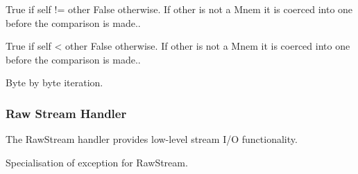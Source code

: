 \documentclass[letterpaper,10pt,english]{sphinxmanual}
\begin{document}
\begin{fulllineitems}
\begin{fulllineitems}
\label{\detokenize{ref/LIS/core/Mnem:TotalDepth.LIS.core.Mnem.Mnem.__ne__}}
True if self != other False otherwise.
If other is not a Mnem it is coerced into one before the comparison is made..

\end{fulllineitems}


\begin{fulllineitems}
\label{\detokenize{ref/LIS/core/Mnem:TotalDepth.LIS.core.Mnem.Mnem.__lt__}}
True if self \textless{} other False otherwise.
If other is not a Mnem it is coerced into one before the comparison is made..

\end{fulllineitems}


\begin{fulllineitems}
\label{\detokenize{ref/LIS/core/Mnem:TotalDepth.LIS.core.Mnem.Mnem.__iter__}}
Byte by byte iteration.

\end{fulllineitems}


\end{fulllineitems}



\subsubsection{Raw Stream Handler}
\label{\detokenize{ref/LIS/core/RawStream:raw-stream-handler}}\label{\detokenize{ref/LIS/core/RawStream::doc}}\label{\detokenize{ref/LIS/core/RawStream:module-TotalDepth.LIS.core.RawStream}}
The RawStream handler provides low-level stream I/O functionality.

\begin{fulllineitems}
\label{\detokenize{ref/LIS/core/RawStream:TotalDepth.LIS.core.RawStream.ExceptionRawStream}}
Specialisation of exception for RawStream.

\end{fulllineitems}
\end{document}
